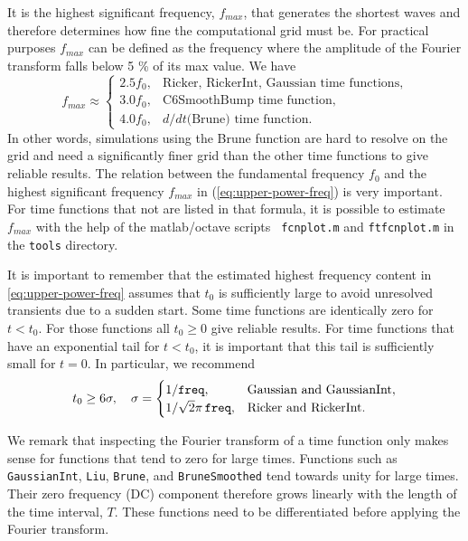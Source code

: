 \documentclass[11pt]{report}
\begin{document}
It is the highest significant frequency, $f_{max}$, that generates the shortest waves
and therefore determines how fine the computational grid must be. For practical purposes $f_{max}$
can be defined as the frequency where the amplitude of the Fourier transform falls below 5 \% of its
max value. We have
\begin{equation}\label{eq:upper-power-freq}
f_{max} \approx \begin{cases}
2.5 f_0,&\mbox{Ricker, RickerInt, Gaussian time functions},\\
3.0 f_0,&\mbox{C6SmoothBump time function},\\
4.0 f_0,&\mbox{$d/dt$(Brune) time function}.
\end{cases}
\end{equation}
In other words, simulations using the Brune function are hard to resolve on the grid and need a
significantly finer grid than the other time functions to give reliable results. The relation
between the fundamental frequency $f_0$ and the highest significant frequency $f_{max}$ in
(\ref{eq:upper-power-freq}) is very important. For time functions that not are listed in that
formula, it is possible to estimate $f_{max}$ with the help of the matlab/octave scripts {\tt
  fcnplot.m} and {\tt ftfcnplot.m} in the {\tt tools} directory.

It is important to remember that the estimated highest frequency content in
\eqref{eq:upper-power-freq} assumes that $t_0$ is sufficiently large to avoid unresolved transients
due to a sudden start. Some time functions are identically zero for $t<t_0$. For those functions all
$t_0\geq 0$ give reliable results. For time functions that have an exponential tail for $t<t_0$, it
is important that this tail is sufficiently small for $t=0$. In particular, we recommend
\[
t_0 \geq 6\sigma,\quad \sigma=\begin{cases}
1/{\tt freq},& \mbox{Gaussian and GaussianInt},\\
1/\sqrt{2}\pi\,{\tt freq},& \mbox{Ricker and RickerInt}.
\end{cases}
\]

We remark that inspecting the Fourier transform of a time function only makes sense for functions
that tend to zero for large times. Functions such as {\tt GaussianInt}, {\tt Liu}, {\tt Brune}, and
{\tt BruneSmoothed} tend towards unity for large times. Their zero frequency (DC) component
therefore grows linearly with the length of the time interval, $T$. These functions need to be
differentiated before applying the Fourier transform.
\end{document}

